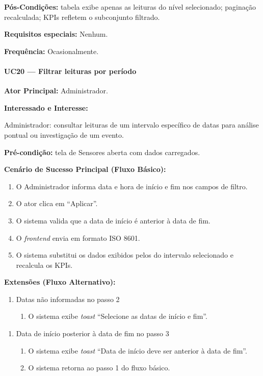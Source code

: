\textbf{Pós-Condições:} tabela exibe apenas as leituras
do nível selecionado; paginação recalculada; KPIs
refletem o subconjunto filtrado.

\textbf{Requisitos especiais:} Nenhum.

\textbf{Frequência:} Ocasionalmente.

\paragraph{UC20 --- Filtrar leituras por período}\hfill\break

\textbf{Ator Principal:} Administrador.

\textbf{Interessado e Interesse:}

Administrador: consultar leituras de um intervalo específico
de datas para análise pontual ou investigação de um evento.

\textbf{Pré-condição:} tela de Sensores aberta com dados
carregados.

\textbf{Cenário de Sucesso Principal (Fluxo Básico):}
\begin{enumerate}
  \item O Administrador informa data e hora de início e
        fim nos campos de filtro.
  \item O ator clica em ``Aplicar''.
  \item O sistema valida que a data de início é anterior
        à data de fim.
  \item O \textit{frontend} envia
        em formato ISO 8601.
  \item O sistema substitui os dados exibidos pelos do
        intervalo selecionado e recalcula os KPIs.
\end{enumerate}

\textbf{Extensões (Fluxo Alternativo):}

\begin{enumerate}
  \renewcommand{\theenumi}{2a}
  \renewcommand{\labelenumi}{\theenumi.}
  \item Datas não informadas no passo 2
  \begin{enumerate}
  \item O sistema exibe \textit{toast}
        ``Selecione as datas de início e fim''.
  \end{enumerate}
\end{enumerate}

\begin{enumerate}
  \renewcommand{\theenumi}{3a}
  \renewcommand{\labelenumi}{\theenumi.}
  \item Data de início posterior à data de fim no passo 3
  \begin{enumerate}
  \item O sistema exibe \textit{toast}
        ``Data de início deve ser anterior à data de fim''.
  \item O sistema retorna ao passo 1 do fluxo básico.
  \end{enumerate}
\end{enumerate}

